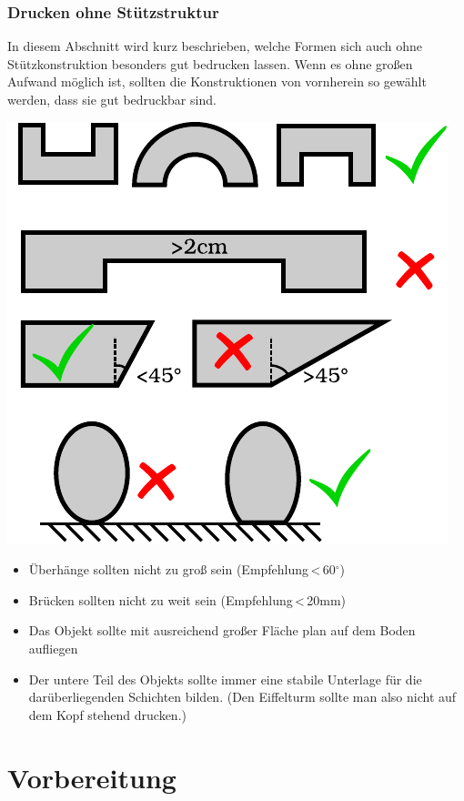 \documentclass{\basedir/fablab-document}
\begin{document}
\subsubsection{Drucken ohne Stützstruktur}
In diesem Abschnitt wird kurz beschrieben, welche Formen sich auch ohne Stützkonstruktion besonders gut bedrucken lassen. Wenn es ohne großen Aufwand möglich ist, sollten die Konstruktionen von vornherein so gewählt werden, dass sie gut bedruckbar sind.
\begin{center}
\includegraphics{./zeichnungen/formen.pdf}
\end{center}
\begin{itemize}
\item Überhänge sollten nicht zu groß sein
(Empfehlung\,{\textless}\,60$^\circ$)
\item Brücken sollten nicht zu weit sein (Empfehlung\,{\textless}\,20mm)
\item Das Objekt sollte mit ausreichend großer Fläche plan auf dem Boden aufliegen
\item Der untere Teil des Objekts sollte immer eine stabile Unterlage für die darüberliegenden Schichten bilden. (Den Eiffelturm sollte man also nicht auf dem Kopf stehend drucken.)
\end{itemize}
\newpage


\section{Vorbereitung}
\end{document}
